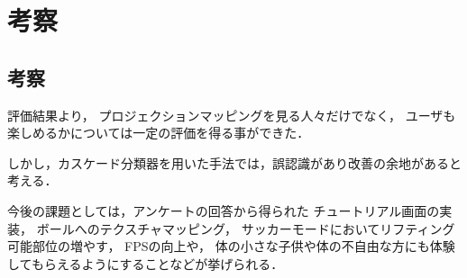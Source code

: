 \chapter{考察}
\thispagestyle{fancy}

\section{考察}
評価結果より，
プロジェクションマッピングを見る人々だけでなく，
ユーザも楽しめるかについては一定の評価を得る事ができた．

しかし，カスケード分類器を用いた手法では，誤認識があり改善の余地があると考える．





今後の課題としては，アンケートの回答から得られた
チュートリアル画面の実装，
ボールへのテクスチャマッピング，
サッカーモードにおいてリフティング可能部位の増やす，
FPSの向上や，
体の小さな子供や体の不自由な方にも体験してもらえるようにすることなどが挙げられる．